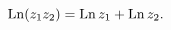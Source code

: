 \[\mathop{\mathrm{Ln}\/}\nolimits\!\left(z_{1}z_{2}\right)=\mathop{\mathrm{Ln}\/%
}\nolimits z_{1}+\mathop{\mathrm{Ln}\/}\nolimits z_{2}.\]